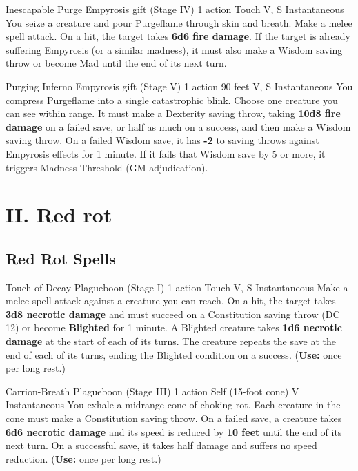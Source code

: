 \documentclass[letterpaper,twocolumn,openany,nodeprecatedcode,breakable,skins,xparse,most]{dndbook}
\begin{document}
\medskip

\DndSpellHeader%
  {Inescapable Purge}
  {Empyrosis gift (Stage IV)}
  {1 action}
  {Touch}
  {V, S}
  {Instantaneous}
You seize a creature and pour Purgeflame through skin and breath. Make a melee spell attack. On a hit, the target takes \textbf{6d6 fire damage}. If the target is already suffering Empyrosis (or a similar madness), it must also make a Wisdom saving throw or become Mad until the end of its next turn.

\medskip

\DndSpellHeader%
  {Purging Inferno}
  {Empyrosis gift (Stage V)}
  {1 action}
  {90 feet}
  {V, S}
  {Instantaneous}
You compress Purgeflame into a single catastrophic blink. Choose one creature you can see within range. It must make a Dexterity saving throw, taking \textbf{10d8 fire damage} on a failed save, or half as much on a success, and then make a Wisdom saving throw. On a failed Wisdom save, it has \textbf{-2} to saving throws against Empyrosis effects for 1 minute. If it fails that Wisdom save by 5 or more, it triggers Madness Threshold (GM adjudication).

\newpage

\section{II. Red rot}
\subsection{Red Rot Spells}

\DndSpellHeader%
  {Touch of Decay}
  {Plagueboon (Stage I)}
  {1 action}
  {Touch}
  {V, S}
  {Instantaneous}
Make a melee spell attack against a creature you can reach. On a hit, the target takes \textbf{3d8 necrotic damage} and must succeed on a Constitution saving throw (DC 12) or become \textbf{Blighted} for 1 minute. A Blighted creature takes \textbf{1d6 necrotic damage} at the start of each of its turns. The creature repeats the save at the end of each of its turns, ending the Blighted condition on a success.
(\textbf{Use:} once per long rest.)

\medskip

\DndSpellHeader%
  {Carrion-Breath}
  {Plagueboon (Stage III)}
  {1 action}
  {Self (15-foot cone)}
  {V}
  {Instantaneous}
You exhale a midrange cone of choking rot. Each creature in the cone must make a Constitution saving throw. On a failed save, a creature takes \textbf{6d6 necrotic damage} and its speed is reduced by \textbf{10 feet} until the end of its next turn. On a successful save, it takes half damage and suffers no speed reduction.
(\textbf{Use:} once per long rest.)
\end{document}
